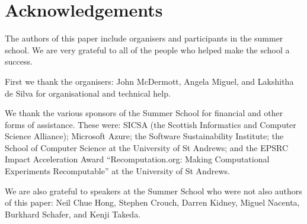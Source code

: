 \section*{Acknowledgements}
\label{s:ack}

The authors of this paper include organisers and participants in the
summer school. We are very grateful to all of the people who helped
make the school a success.

First we thank the organisers: John McDermott, Angela Miguel, and Lakshitha de Silva for organisational and technical help.

We thank the various sponsors of the Summer School  for financial and other forms of assistance.
These were: SICSA (the Scottish Informatics and Computer Science Alliance); 
Microsoft Azure; the Software Sustainability Institute; 
the School of Computer Science at the University of St Andrews; 
and the EPSRC Impact Acceleration Award ``Recomputation.org: Making
Computational Experiments Recomputable''
at the University of St Andrews.

We are also grateful to speakers at the Summer School who were not also authors of this paper: 
Neil Chue Hong,
Stephen Crouch, 
Darren Kidney, 
Miguel Nacenta,
Burkhard Schafer, and
Kenji Takeda.


